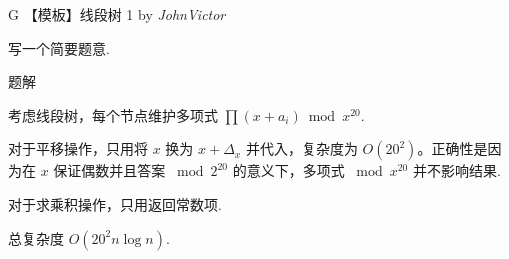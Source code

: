 \begin{frame}{G 【模板】线段树 1 {by \itshape JohnVictor}}

	写一个简要题意.

\end{frame}

\begin{frame}{题解}

	考虑线段树，每个节点维护多项式 $\prod(x+a_i)\bmod x^{20}$. 

	对于平移操作，只用将 $x$ 换为 $x+\Delta_x$ 并代入，复杂度为 $O(20^2)$。正确性是因为在 $x$ 保证偶数并且答案 $\bmod 2^{20}$ 的意义下，多项式 $\bmod x^{20}$ 并不影响结果.

	对于求乘积操作，只用返回常数项.

	总复杂度 $O(20^2 n\log n)$.

\end{frame}
